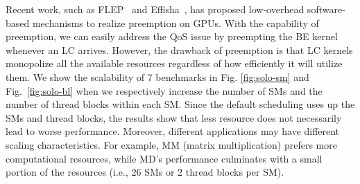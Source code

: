 Recent work, such as FLEP~\cite{Wu:ASPLOS2017} and Effisha~\cite{Chen:PPoPP2017}, has proposed low-overhead software-based mechanisms to  realize preemption on GPUs.  With the capability of preemption, we can easily address the QoS issue by preempting  the BE kernel whenever an LC arrives. However, the drawback of preemption is that LC kernels monopolize all the available resources regardless of how efficiently it will utilize them. We show the scalability of 7 benchmarks in Fig. \ref{fig:solo-sm} and Fig.~\ref{fig:solo-bl} when we respectively increase the number of SMs and the number of thread blocks within each SM. Since the default scheduling uses up the SMs and thread blocks, the results show that less resource does not necessarily lead to worse performance. Moreover, different applications may have different scaling characteristics. For example, MM (matrix multiplication) prefers more computational resources, while MD's performance culminates with a small portion of the resources (i.e., 26 SMs or 2 thread blocks per SM).

